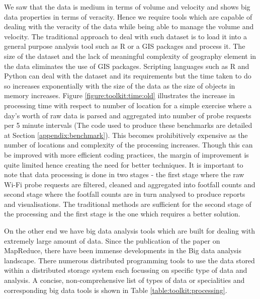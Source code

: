 We saw that the data is medium in terms of volume and velocity and shows big data properties in terms of veracity.
Hence we require tools which are capable of dealing with the veracity of the data while being able to manage the volume and velocity.
The traditional approach to deal with such dataset is to load it into a general purpose analysis tool such as R or a GIS packages and process it.
The size of the dataset and the lack of meaningful complexity of geography element in the data eliminates the use of GIS packages.
Scripting languages such as R and Python can deal with the dataset and its requirements but the time taken to do so increases exponentially with the size of the data as the size of objects in memory increases.
Figure \ref{figure:toolkit:time:old} illustrates the increase in processing time with respect to number of location for a simple exercise where a day's worth of raw data is parsed and aggregated into number of probe requests per 5 minute intervals 
(The code used to produce these benchmarks are detailed at Section \ref{appendix:benchmark}).
This becomes prohibitively expensive as the number of locations and complexity of the processing increases.
Though this can be improved with more efficient coding practices, the margin of improvement is quite limited hence creating the need for better techniques.
It is important to note that data processing is done in two stages - the first stage where the raw Wi-Fi probe requests are filtered, cleaned and aggregated into footfall counts and second stage where the footfall counts are in turn analysed to produce reports and visualisations.
The traditional methods are sufficient for the second stage of the processing and the first stage is the one which requires a better solution.

On the other end we have big data analysis tools which are built for dealing with extremely large amount of data.
Since the publication of the paper on MapReduce, there have been immense developments in the Big data analysis landscape.
There numerous distributed programming tools to use the data stored within a distributed storage system each focussing on specific type of data and analysis.
A concise, non-comprehensive list of types of data or specialities and corresponding big data tools is shown in Table \ref{table:toolkit:processing}.


